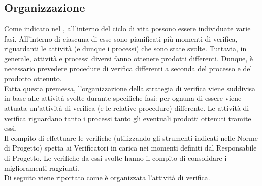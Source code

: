 	\subsection{Organizzazione}
		Come indicato nel , all'interno del ciclo di vita possono essere individuate varie fasi. All'interno di ciascuna di 
		esse sono pianificati più momenti di verifica, riguardanti le attività (e dunque i processi) che sono state svolte. Tuttavia, in generale, attività 
		e processi diversi fanno ottenere prodotti differenti. Dunque, è necessario prevedere procedure di verifica differenti a seconda del processo e del 
		prodotto ottenuto.\\
		Fatta questa premessa, l'organizzazione della strategia di verifica viene suddivisa in base alle attività svolte durante specifiche fasi: per ognuna 
		di essere viene attuata un'attività di verifica (e le relative procedure) differente. Le attività di verifica riguardano tanto i processi tanto gli 
		eventuali prodotti ottenuti tramite essi.\\
		Il compito di effettuare le verifiche (utilizzando gli strumenti indicati nelle Norme di Progetto) spetta ai Verificatori in carica nei momenti 
		definiti dal Responsabile di Progetto. Le verifiche da essi svolte hanno il compito di consolidare i miglioramenti raggiunti.\\
		Di seguito viene riportato come è organizzata l'attività di verifica.
